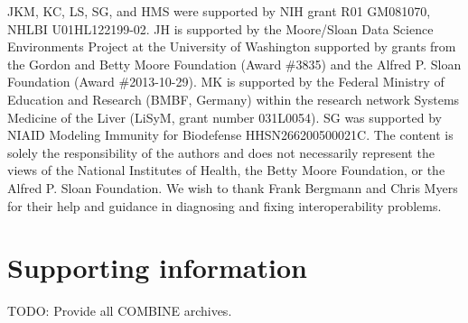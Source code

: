 \documentclass[10pt,letterpaper]{article}
\begin{document}
JKM, KC, LS, SG, and HMS were supported by NIH grant R01 GM081070, NHLBI U01HL122199-02. JH is supported by the Moore/Sloan Data Science Environments Project at the University of Washington supported by grants from the Gordon and Betty Moore Foundation (Award \#3835) and the Alfred P. Sloan Foundation (Award \#2013-10-29). MK is supported by the Federal Ministry of Education and Research (BMBF, Germany) within the research network Systems Medicine of the Liver (LiSyM, grant number 031L0054). SG was supported by NIAID Modeling Immunity for Biodefense HHSN266200500021C. The content is solely the responsibility of the authors and does not necessarily represent the views of the National Institutes of Health, the Betty Moore Foundation, or the Alfred P. Sloan Foundation.
We wish to thank Frank Bergmann and Chris Myers for their help and guidance in diagnosing and fixing interoperability problems.

\section*{Supporting information}

TODO: Provide all COMBINE archives.




\end{document}
